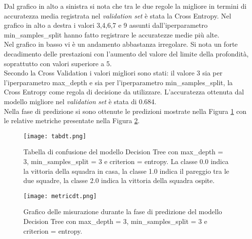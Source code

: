 Dal grafico in alto a sinistra si nota che tra le due regole la migliore in termini di accuratezza media registrata nel \emph{validation set} è stata la Cross Entropy. Nel grafico in alto a destra i valori 3,4,6,7 e 9 assunti dall'iperparametro \textsf{min\_samples\_split} hanno fatto registrare le accuratezze medie più alte.\\
Nel grafico in basso vi è un andamento abbastanza irregolare. Si nota un forte decadimento delle prestazioni con l'aumento del valore del limite della profondità, soprattutto con valori superiore a 5.\\
Secondo la Cross Validation i valori migliori sono stati: il valore 3 sia per l'iperparametro \textsf{max\_depth} e sia per l'iperparametro \textsf{min\_samples\_split}, la Cross Entropy come regola di decisione da utilizzare. L'accuratezza ottenuta dal modello migliore nel \emph{validation} \emph{set} è stata di 0.684.\\
Nella fase di predizione si sono ottenute le predizioni mostrate nella Figura \ref{fig:tabdt} con le relative metriche presentate nella Figura \ref{fig:dtmetrics}.
\begin{figure}[h]
	\begin{center}
		\texttt{[image: tabdt.png]}
		\caption{Tabella di confusione del modello Decision Tree con \textsf{max\_depth} = 3, \textsf{min\_samples\_split} = 3 e \textsf{criterion} = entropy. La classe 0.0 indica la vittoria della squadra in casa, la classe 1.0 indica il pareggio tra le due squadre, la classe 2.0 indica la vittoria della squadra ospite.
		} 
		\label{fig:tabdt}
	\end{center}
\end{figure}

\begin{figure}[]
	\begin{center}
		\texttt{[image: metricdt.png]}
		\caption{Grafico delle misurazione durante la fase di predizione del modello Decision Tree con \textsf{max\_depth} = 3, \textsf{min\_samples\_split} = 3 e \textsf{criterion} = entropy.
		} 
		\label{fig:dtmetrics}
	\end{center}
\end{figure}

